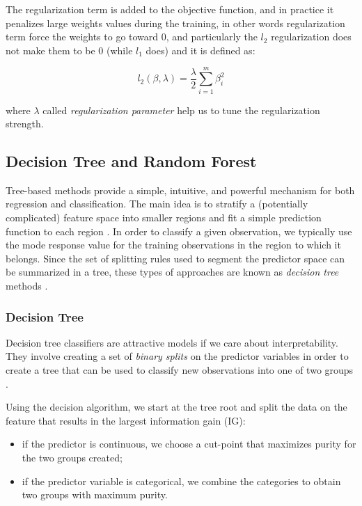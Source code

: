 \documentclass{article}
\begin{document}
The regularization term is added to the objective function, and in practice it penalizes large weights values during the training, in other words regularization term force the weights to go toward 0, and particularly the $l_{2}$ regularization does not make them to be 0 (while $l_{1}$ does) and it is defined as:

\begin{equation}
l_{2}(\beta, \lambda) = \frac{\lambda}{2}\sum_{i=1}^{m}\beta_{i}^{2}
\end{equation}

where $\lambda$ called \emph{regularization parameter} help us to tune the regularization strength.

\subsection{Decision Tree and Random Forest}

Tree-based methods provide a simple, intuitive, and powerful mechanism for both regression and classification. The main idea is to stratify a (potentially complicated) feature space into smaller regions and fit a simple prediction function to each region \cite{sedici}. In order to classify a given observation, we typically use the mode response value for the training observations in the region to which it belongs. Since the set of splitting rules used to segment the predictor space can be summarized in a tree, these types of approaches are known as \emph{decision tree} methods \cite{sedici}.

\subsubsection{Decision Tree}
Decision tree classifiers are attractive models if we care about interpretability. They involve creating a set of \emph{binary splits} on the predictor variables in order to create a tree that can be used to classify new observations into one of two groups \cite{ventuno}.


Using the decision algorithm, we start at the tree root and split the data on the feature that results in the largest information gain (IG):
\begin{itemize}
    \item if the predictor is continuous, we choose a cut-point that maximizes purity for the two groups created;
    \item if the predictor variable is categorical, we combine the categories to obtain two groups with maximum purity.
\end{itemize}
\end{document}
